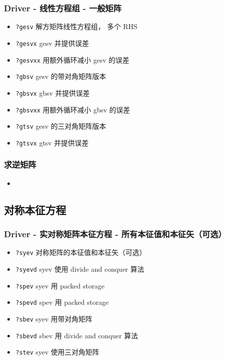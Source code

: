 \subsubsection{Driver - 线性方程组 - 一般矩阵}
\begin{itemize}
\item \verb|?gesv| 解方矩阵线性方程组， 多个 RHS
\item \verb|?gesvx| gesv 并提供误差
\item \verb|?gesvxx| 用额外循环减小 gesv 的误差
\item \verb|?gbsv| gesv 的带对角矩阵版本
\item \verb|?gbsvx| gbsv 并提供误差
\item \verb|?gbsvxx| 用额外循环减小 gbsv 的误差
\item \verb|?gtsv| gesv 的三对角矩阵版本
\item \verb|?gtsvx| gtsv 并提供误差
\end{itemize}

\subsubsection{求逆矩阵}
\begin{itemize}
\item 
\end{itemize}


\subsection{对称本征方程}
\subsubsection{Driver - 实对称矩阵本征方程 - 所有本征值和本征矢（可选）}
\begin{itemize}
\item \verb|?syev| 对称矩阵的本征值和本征矢（可选）
\item \verb|?syevd| syev 使用 divide and conquer 算法
\item \verb|?spev| syev 用 packed storage
\item \verb|?spevd| spev 用 packed storage
\item \verb|?sbev| syev 用带对角矩阵
\item \verb|?sbevd| sbev 用 divide and conquer 算法
\item \verb|?stev| syev 使用三对角矩阵
\end{itemize}

